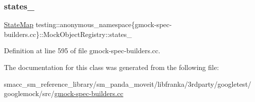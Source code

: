 \subsubsection{\texorpdfstring{states\+\_\+}{states\_}}
{\footnotesize\ttfamily \hyperlink{classtesting_1_1anonymous__namespace_02gmock-spec-builders_8cc_03_1_1MockObjectRegistry_aaa830ac72cc6bc5007f65f7257d97765}{State\+Map} testing\+::anonymous\+\_\+namespace\{gmock-\/spec-\/builders.\+cc\}\+::Mock\+Object\+Registry\+::states\+\_\+\hspace{0.3cm}{\ttfamily [private]}}



Definition at line 595 of file gmock-\/spec-\/builders.\+cc.



The documentation for this class was generated from the following file\+:\begin{DoxyCompactItemize}
\item 
smacc\+\_\+sm\+\_\+reference\+\_\+library/sm\+\_\+panda\+\_\+moveit/libfranka/3rdparty/googletest/googlemock/src/\hyperlink{gmock-spec-builders_8cc}{gmock-\/spec-\/builders.\+cc}\end{DoxyCompactItemize}
